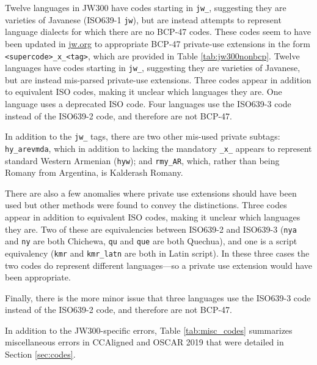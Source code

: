 Twelve languages in JW300 have codes starting in \texttt{jw\_}, suggesting they are varieties of Javanese (ISO639-1 \texttt{jw}), but are instead attempts to represent language dialects for which there are no BCP-47 codes. These codes seem to have been updated in \url{jw.org} to appropriate BCP-47 private-use extensions in the form \texttt{<supercode>\_x\_<tag>}, which are provided in Table \ref{tab:jw300nonbcp}.
Twelve languages have codes starting in \texttt{jw\_}, suggesting they are varieties of Javanese, but are instead mis-parsed private-use extensions. Three codes appear in addition to equivalent ISO codes, making it unclear which languages they are. One language uses a deprecated ISO code. Four languages use the ISO639-3 code instead of the ISO639-2 code, and therefore are not BCP-47.

In addition to the \texttt{jw\_} tags, there are two other mis-used private subtags: \texttt{hy\_arevmda}, which in addition to lacking the mandatory \texttt{\_x\_} appears to represent standard Western Armenian (\texttt{hyw}); and \texttt{rmy\_AR}, which, rather than being Romany from Argentina, is Kalderash Romany.

There are also a few anomalies where private use extensions should have been used but other methods were found to convey the distinctions. Three codes appear in addition to equivalent ISO codes, making it unclear which languages they are. Two of these are equivalencies between  ISO639-2 and  ISO639-3 (\texttt{nya} and \texttt{ny} are both Chichewa, \texttt{qu} and \texttt{que} are both Quechua), and one is a script equivalency (\texttt{kmr} and \texttt{kmr\_latn} are both in Latin script). In these three cases the two codes do represent different languages---so a private use extension would have been appropriate.

Finally, there is the more minor issue that three languages use the ISO639-3 code instead of the ISO639-2 code, and therefore are not BCP-47.


In addition to the JW300-specific errors, Table \ref{tab:misc_codes} summarizes miscellaneous errors in CCAligned and OSCAR 2019 that were detailed in Section \ref{sec:codes}.

